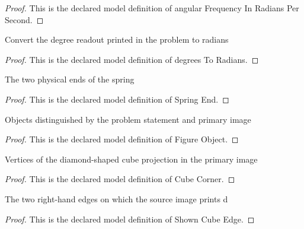 \begin{proof}
  This is the declared model definition of angular Frequency In Radians Per Second.
\end{proof}
\begin{definition}
  \label{def:physics:phyx-mini-0267:phyxminiproblems-problemphyxmini0267-degreestoradians}
  Convert the degree readout printed in the problem to radians
\end{definition}
\begin{proof}
  This is the declared model definition of degrees To Radians.
\end{proof}
\begin{definition}
  \label{def:physics:phyx-mini-0267:phyxminiproblems-problemphyxmini0267-springend}
  The two physical ends of the spring
\end{definition}
\begin{proof}
  This is the declared model definition of Spring End.
\end{proof}
\begin{definition}
  \label{def:physics:phyx-mini-0267:phyxminiproblems-problemphyxmini0267-figureobject}
  Objects distinguished by the problem statement and primary image
\end{definition}
\begin{proof}
  This is the declared model definition of Figure Object.
\end{proof}
\begin{definition}
  \label{def:physics:phyx-mini-0267:phyxminiproblems-problemphyxmini0267-cubecorner}
  Vertices of the diamond-shaped cube projection in the primary image
\end{definition}
\begin{proof}
  This is the declared model definition of Cube Corner.
\end{proof}
\begin{definition}
  \label{def:physics:phyx-mini-0267:phyxminiproblems-problemphyxmini0267-showncubeedge}
  The two right-hand edges on which the source image prints d
\end{definition}
\begin{proof}
  This is the declared model definition of Shown Cube Edge.
\end{proof}
